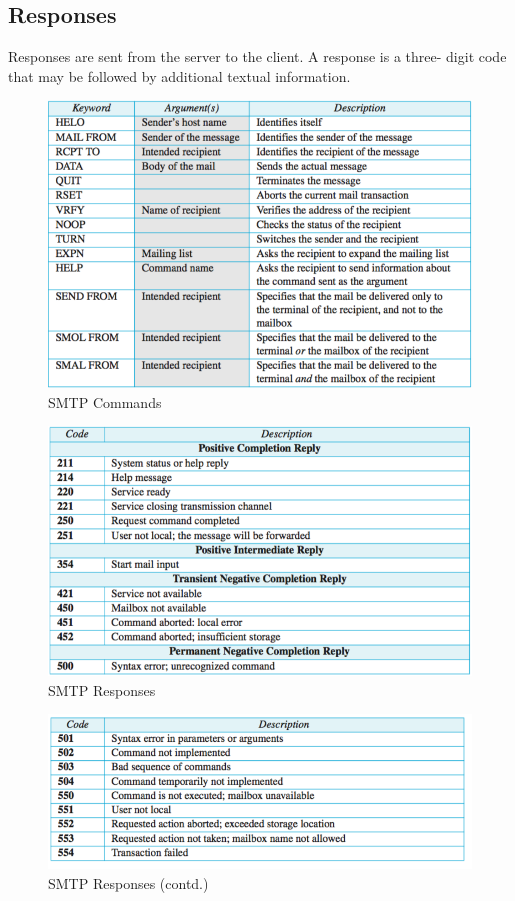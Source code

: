 \documentclass[a4paper,12pt]{article}
\begin{document}
 \subsection{Responses}
 Responses are sent from the server to the client. A response is a 
 three- digit code that may be followed by additional textual information.

\begin{figure}
	\includegraphics[width=\linewidth]{./SMTPcommads.png}
	\caption{SMTP Commands}
	\label{fig:smtpcommands}
\end{figure}
\begin{figure}
	\includegraphics[width=\linewidth]{./SMTPresponses.png}
	\caption{SMTP Responses}
	\label{fig:smtpcommands}
\end{figure}
\begin{figure}
	\includegraphics[width=\linewidth]{./SMTPresponses1.png}
	\caption{SMTP Responses (contd.)}
	\label{fig:smtpcommands}
\end{figure}
\end{document}
